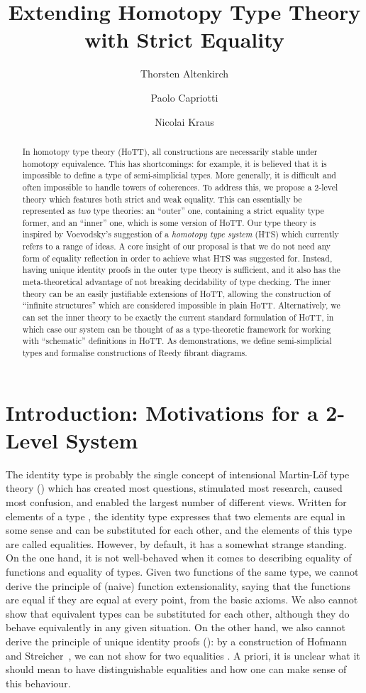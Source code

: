 \documentclass[a4paper,reqno]{amsart}
\title{Extending Homotopy Type Theory with Strict Equality}
\author{Thorsten Altenkirch \and Paolo Capriotti \and Nicolai Kraus}
\theoremstyle{plain}
\theoremstyle{definition}
\begin{document}
\begin{abstract}
In homotopy type theory (HoTT), all constructions are necessarily stable under homotopy equivalence.  This has shortcomings: for example, it is believed that it is impossible to define a type of semi-simplicial types.  More generally, it is difficult and often impossible to handle towers of coherences.  To address this, we propose a 2-level theory which features both strict and weak equality.  This can essentially be represented as \emph{two} type theories: an ``outer'' one, containing a strict equality type former, and an ``inner'' one, which is some version of HoTT.  Our type theory is inspired by Voevodsky's suggestion of a \emph{homotopy type system} (HTS) which currently refers to a range of ideas.  A core insight of our proposal is that we do not need any form of equality reflection in order to achieve what HTS was suggested for.  Instead, having unique identity proofs in the outer type theory is sufficient, and it also has the meta-theoretical advantage of not breaking decidability of type checking.  The inner theory can be an easily justifiable extensions of HoTT, allowing the construction of ``infinite structures'' which are considered impossible in plain HoTT. Alternatively, we can set the inner theory to be exactly the current standard formulation of HoTT, in which case our system can be thought of as a type-theoretic framework for working with ``schematic'' definitions in HoTT.  As demonstrations, we define semi-simplicial types and formalise constructions of Reedy fibrant diagrams.
\end{abstract}
\maketitle


\section{Introduction: Motivations for a 2-Level System}

The identity type is probably the single concept of intensional Martin-L\"of type theory () which has created most questions, stimulated most research, caused most confusion, and enabled the largest number of different views.
Written  for elements  of a type , the identity type expresses that two elements are equal in some sense and can be substituted for each other, and the elements of this type are called equalities.
However, by default, it has a somewhat strange standing.
On the one hand, it is not well-behaved when it comes to describing equality of functions and equality of types.
Given two functions of the same type, we cannot derive the principle of (naive) function extensionality, saying that the functions are equal if they are equal at every point, from the basic axioms.
We also cannot show that equivalent types can be substituted for each other, although they do behave equivalently in any given situation.
On the other hand, we also cannot derive the principle of unique identity proofs (): by a construction of Hofmann and Streicher~\cite{hofmannStreicher_groupoids}, we can not show  for two equalities . A priori, it is unclear what it should mean to have distinguishable equalities and how one can make sense of this behaviour.
\end{document}
